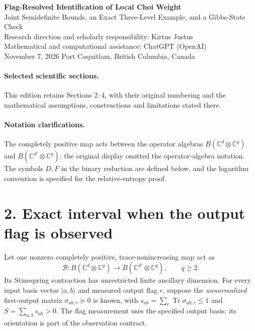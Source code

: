 \documentclass[10pt,letterpaper]{article}
\newcommand{\Tr}{\operatorname{Tr}}
\newcommand{\cB}{\mathcal B}
\newcommand{\C}{\mathbb C}
\begin{document}
\begin{center}
{\Large\bfseries Flag-Resolved Identification of Local Choi Weight}\\[3pt]
{\large Joint Semidefinite Bounds, an Exact Three-Level Example, and a Gibbs-State Check}\\[8pt]
Research direction and scholarly responsibility: Kirtus Justus\\
Mathematical and computational assistance: ChatGPT (OpenAI)\\
November 7, 2026 \quad Port Coquitlam, British Columbia, Canada
\end{center}
\vspace{-7pt}
\paragraph{Selected scientific sections.} This edition retains Sections 2--4, with their original numbering and the mathematical assumptions, constructions and limitations stated there.
\paragraph{Notation clarifications.} The completely positive map acts between the operator algebras $B(\C^d\otimes\C^q)$ and $B(\C^{d'}\otimes\C^q)$; the original display omitted the operator-algebra notation. The symbols $D,F$ in the binary reduction are defined below, and the logarithm convention is specified for the relative-entropy proof.

\section*{2. Exact interval when the output flag is observed}
Let one nonzero completely positive, trace-nonincreasing map act as
\[
 \cB:B(\C^d\otimes\C^q)\longrightarrow B(\C^{d'}\otimes\C^q),\qquad q\ge 2 .
\]
Its Stinespring contraction has unrestricted finite ancillary dimension. For every
input basis vector $|a,b\rangle$ and measured output flag $r$, suppose the
\emph{unnormalized} first-output matrix $\sigma_{ab,r}\succeq0$ is known,
with $s_{ab}=\sum_r\Tr\sigma_{ab,r}\le1$ and
$S=\sum_{a,b}s_{ab}>0$. The flag measurement uses the specified output basis;
its orientation is part of the observation contract.
\end{document}
